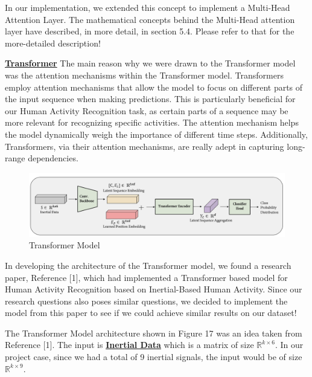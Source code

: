 \documentclass[conference]{IEEEtran}
\begin{document}
In our implementation, we extended this concept to implement a Multi-Head Attention Layer. The mathematical concepts behind the Multi-Head attention layer have described, in more detail, in section 5.4. Please refer to that for the more-detailed description! \newline 

\textbf{\underline{Transformer}} \newline 
The main reason why we were drawn to the Transformer model was the attention mechanisms within the Transformer model. Transformers employ attention mechanisms that allow the model to focus on different parts of the input sequence when making predictions. This is particularly beneficial for our Human Activity Recognition task, as certain parts of a sequence may be more relevant for recognizing specific activities. The attention mechanism helps the model dynamically weigh the importance of different time steps. Additionally, Transformers, via their attention mechanisms, are really adept in capturing long-range dependencies. \newline 

\begin{figure}[h!]
	\includegraphics[width= 0.9 \linewidth]{imu_model.png}
	\centering
	\caption{Transformer Model}
	\label{imu_model.png}
\end{figure}

In developing the architecture of the Transformer model, we found a research paper, Reference [1], which had implemented a Transformer based model for Human Activity Recognition based on Inertial-Based Human Activity. Since our research questions also poses similar questions, we decided to implement the model from this paper to see if we could achieve similar results on our dataset! \newline 

The Transformer Model architecture shown in Figure 17 was an idea taken from Reference [1]. The input is \underline{\textbf{Inertial Data}} which is a matrix of size $\mathbb{R}^{k \times 6}$. In our project case, since we had a total of 9 inertial signals, the input would be of size $\mathbb{R}^{k \times 9}$. \newline 
\end{document}
